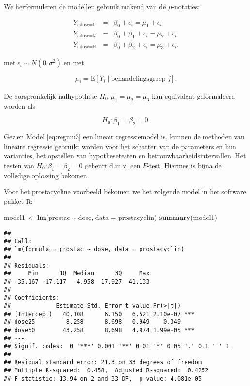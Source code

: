\documentclass[
  12pt,dutch,coursenotes]{book}
\newenvironment{Shaded}{\begin{snugshade}}{\end{snugshade}}
\newcommand{\DataTypeTok}[1]{\textcolor[rgb]{0.13,0.29,0.53}{#1}}
\newcommand{\KeywordTok}[1]{\textcolor[rgb]{0.13,0.29,0.53}{\textbf{#1}}}
\newcommand{\NormalTok}[1]{#1}
\newcommand{\OperatorTok}[1]{\textcolor[rgb]{0.81,0.36,0.00}{\textbf{#1}}}
\newcommand{\StringTok}[1]{\textcolor[rgb]{0.31,0.60,0.02}{#1}}
\theoremstyle{definition}
\theoremstyle{definition}
\theoremstyle{definition}
\theoremstyle{remark}
\begin{document}
We herformuleren de modellen gebruik makend van de \(\mu\)-notaties:

\begin{eqnarray*}
 Y_{i\vert \text{dose=L}} &=& \beta_0+\epsilon_i = \mu_1+\epsilon_i \\
 Y_{i\vert \text{dose=M}} &=& \beta_0+\beta_1+ \epsilon_i = \mu_2+\epsilon_i \\
 Y_{i\vert \text{dose=H}} &=& \beta_0+\beta_2 + \epsilon_i = \mu_3+\epsilon_i .
\end{eqnarray*}

met \(\epsilon_i \sim N(0,\sigma^2)\) en met

\[  \mu_j = \text{E}\left[Y_i \mid \text{behandelingsgroep } j\right].\]

De oorspronkelijk nulhypothese \(H_0:\mu_1=\mu_2=\mu_3\) kan equivalent geformuleerd worden als

\[H_0: \beta_1=\beta_2=0.\]

Gezien Model \eqref{eq:regmu3} een lineair regressiemodel is, kunnen de methoden van lineaire regressie gebruikt worden voor het schatten van de parameters en hun varianties, het opstellen van hypothesetesten en betrouwbaarheidsintervallen.
Het testen van \(H_0: \beta_1=\beta_2=0\) gebeurt d.m.v. een \(F\)-test.
Hiermee is bijna de volledige oplossing bekomen.

Voor het prostacycline voorbeeld bekomen we het volgende model in het software pakket R:

\begin{Shaded}
\begin{Highlighting}[]
\NormalTok{model1 \textless{}{-}}\StringTok{ }\KeywordTok{lm}\NormalTok{(prostac }\OperatorTok{\textasciitilde{}}\StringTok{ }\NormalTok{dose, }\DataTypeTok{data =}\NormalTok{ prostacyclin)}
\KeywordTok{summary}\NormalTok{(model1)}
\end{Highlighting}
\end{Shaded}

\begin{verbatim}
## 
## Call:
## lm(formula = prostac ~ dose, data = prostacyclin)
## 
## Residuals:
##     Min      1Q  Median      3Q     Max 
## -35.167 -17.117  -4.958  17.927  41.133 
## 
## Coefficients:
##             Estimate Std. Error t value Pr(>|t|)    
## (Intercept)   40.108      6.150   6.521 2.10e-07 ***
## dose25         8.258      8.698   0.949    0.349    
## dose50        43.258      8.698   4.974 1.99e-05 ***
## ---
## Signif. codes:  0 '***' 0.001 '**' 0.01 '*' 0.05 '.' 0.1 ' ' 1
## 
## Residual standard error: 21.3 on 33 degrees of freedom
## Multiple R-squared:  0.458,  Adjusted R-squared:  0.4252 
## F-statistic: 13.94 on 2 and 33 DF,  p-value: 4.081e-05
\end{verbatim}
\end{document}
